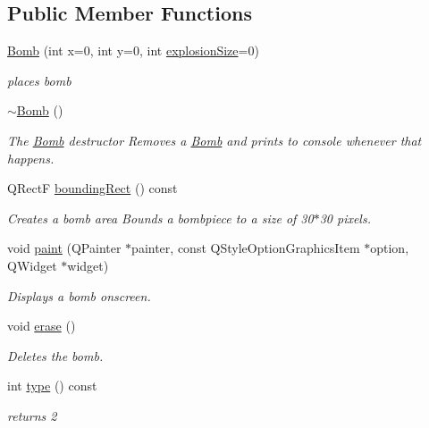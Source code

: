 \subsection*{Public Member Functions}
\begin{DoxyCompactItemize}
\item 
\hyperlink{class_bomb_ada9d05fb30c035691190e80d1d0a1c7f}{Bomb} (int x=0, int y=0, int \hyperlink{class_bomb_a7576bf99d4bcfbc7dda365511ca2fcd7}{explosion\-Size}=0)
\begin{DoxyCompactList}\small\item\em places bomb \end{DoxyCompactList}\item 
\hyperlink{class_bomb_acbb47327cfb2fa429887774ef3597965}{$\sim$\-Bomb} ()
\begin{DoxyCompactList}\small\item\em The \hyperlink{class_bomb}{Bomb} destructor Removes a \hyperlink{class_bomb}{Bomb} and prints to console whenever that happens. \end{DoxyCompactList}\item 
Q\-Rect\-F \hyperlink{class_bomb_ad047941e8f1413a061f98f460dcea22a}{bounding\-Rect} () const 
\begin{DoxyCompactList}\small\item\em Creates a bomb area Bounds a bombpiece to a size of 30$\ast$30 pixels. \end{DoxyCompactList}\item 
void \hyperlink{class_bomb_ab8e930cc66f5d3f41e8a02f3d0d8185e}{paint} (Q\-Painter $\ast$painter, const Q\-Style\-Option\-Graphics\-Item $\ast$option, Q\-Widget $\ast$widget)
\begin{DoxyCompactList}\small\item\em Displays a bomb onscreen. \end{DoxyCompactList}\item 
void \hyperlink{class_bomb_aacd1b797985f1f77e896c69a067126ec}{erase} ()
\begin{DoxyCompactList}\small\item\em Deletes the bomb. \end{DoxyCompactList}\item 
int \hyperlink{class_bomb_aa555383c82ad5ea7155e8fccbd9566a8}{type} () const 
\begin{DoxyCompactList}\small\item\em returns 2 \end{DoxyCompactList}\end{DoxyCompactItemize}
